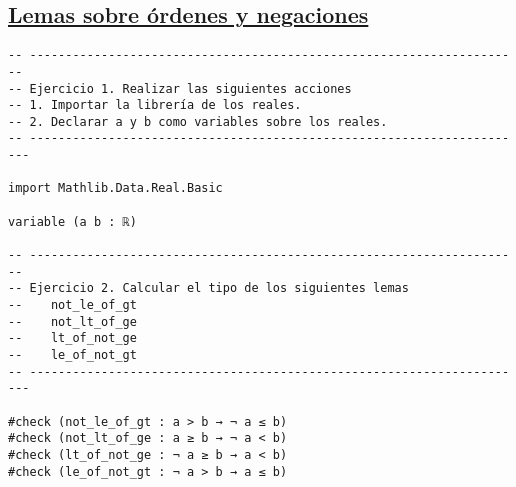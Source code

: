 \subsection{\href{./src/Logica/Lemas\_sobre\_ordenes\_y\_negaciones.lean}{Lemas sobre órdenes y negaciones}}
\label{sec:org68cc20a}
\begin{verbatim}
-- ---------------------------------------------------------------------
-- Ejercicio 1. Realizar las siguientes acciones
-- 1. Importar la librería de los reales.
-- 2. Declarar a y b como variables sobre los reales.
-- ----------------------------------------------------------------------

import Mathlib.Data.Real.Basic

variable (a b : ℝ)

-- ---------------------------------------------------------------------
-- Ejercicio 2. Calcular el tipo de los siguientes lemas
--    not_le_of_gt
--    not_lt_of_ge
--    lt_of_not_ge
--    le_of_not_gt
-- ----------------------------------------------------------------------

#check (not_le_of_gt : a > b → ¬ a ≤ b)
#check (not_lt_of_ge : a ≥ b → ¬ a < b)
#check (lt_of_not_ge : ¬ a ≥ b → a < b)
#check (le_of_not_gt : ¬ a > b → a ≤ b)
\end{verbatim}

